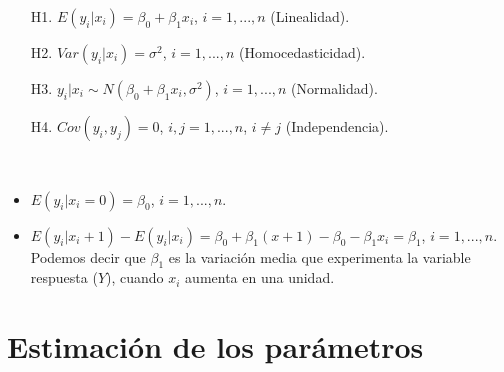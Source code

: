 \begin{enumerate}
    \item[H1.] $E(y_i | x_i) = \beta_0 + \beta_1 x_i$, $i=1,...,n$ (Linealidad).
    \item[H2.] $Var(y_i | x_i) = \sigma^2$, $i=1,...,n$ (Homocedasticidad).
    \item[H3.] $y_i | x_i \sim N(\beta_0 + \beta_1 x_i, \sigma^2)$, $i=1,...,n$ (Normalidad).
    \item[H4.] $Cov(y_i,y_j) = 0$, $i,j=1,...,n$, $i \not = j$ (Independencia).
\end{enumerate}

\begin{obs} \
    \begin{itemize}
        \item $E(y_i | x_i = 0) = \beta_0$, $i=1,...,n$.
        \item $E(y_i | x_i + 1) - E(y_i | x_i) = \beta_0 + \beta_1(x+1) - \beta_0 - \beta_1 x_i = \beta_1$, $i=1,...,n$. Podemos decir que $\beta_1$ es la variación media que experimenta la variable respuesta ($Y$), cuando $x_i$ aumenta en una unidad.
    \end{itemize}
\end{obs}

\section{Estimación de los parámetros}

